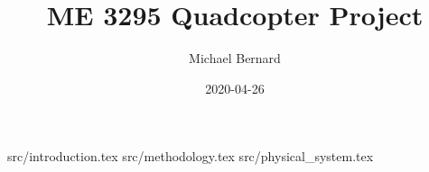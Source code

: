 \documentclass[12pt]{report}
\title{ME 3295 Quadcopter Project}
\author{Michael Bernard}
\date{2020-04-26}
\begin{document}
\maketitle

{src/introduction.tex}
{src/methodology.tex}
{src/physical_system.tex}


\end{document}
